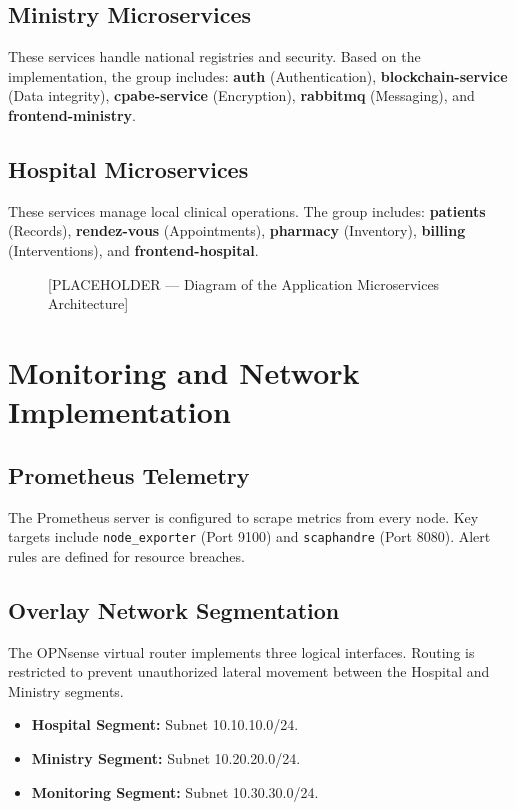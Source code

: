 \documentclass[12pt,a4paper]{report}
\begin{document}
\subsection{Ministry Microservices}
These services handle national registries and security. Based on the implementation, the group includes: \textbf{auth} (Authentication), \textbf{blockchain-service} (Data integrity), \textbf{cpabe-service} (Encryption), \textbf{rabbitmq} (Messaging), and \textbf{frontend-ministry}.

\subsection{Hospital Microservices}
These services manage local clinical operations. The group includes: \textbf{patients} (Records), \textbf{rendez-vous} (Appointments), \textbf{pharmacy} (Inventory), \textbf{billing} (Interventions), and \textbf{frontend-hospital}.

\begin{figure}[htbp]
\centering
\fbox{\rule{0pt}{5cm}\rule{0.9\linewidth}{0pt}}
\caption{[PLACEHOLDER — Diagram of the Application Microservices Architecture]}
\label{fig:app_arch}
\end{figure}

\section{Monitoring and Network Implementation}

\subsection{Prometheus Telemetry}
The Prometheus server is configured to scrape metrics from every node. Key targets include \texttt{node\_exporter} (Port 9100) and \texttt{scaphandre} (Port 8080). Alert rules are defined for resource breaches.

\subsection{Overlay Network Segmentation}
The OPNsense virtual router implements three logical interfaces. Routing is restricted to prevent unauthorized lateral movement between the Hospital and Ministry segments.
\begin{itemize}
    \item \textbf{Hospital Segment:} Subnet 10.10.10.0/24.
    \item \textbf{Ministry Segment:} Subnet 10.20.20.0/24.
    \item \textbf{Monitoring Segment:} Subnet 10.30.30.0/24.
\end{itemize}
\end{document}
